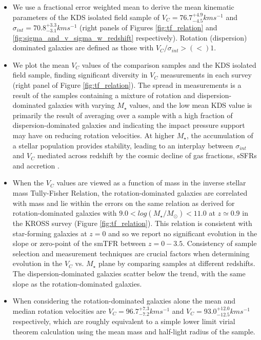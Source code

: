 \documentclass[fleqn,usenatbib]{mnras}
\begin{document}
\begin{itemize}
    \item We use a fractional error weighted mean to derive the mean kinematic parameters of the KDS isolated field sample of $V_{C} = 76.7^{+4.9}_{-4.5}kms^{-1}$ and $\sigma_{int} = 70.8^{+3.3}_{-3.1} kms^{-1}$ (right panels of Figures \ref{fig:tf_relation} and \ref{fig:sigma_and_v_sigma_w_redshift} respectively).
    Rotation (dispersion) dominated galaxies are defined as those with $V_{C}/\sigma_{int} > (<) 1$.  
    \item We plot the mean $V_{C}$ values of the comparison samples and the KDS isolated field sample, finding significant diversity in $V_{C}$ measurements in each survey (right panel of Figure \ref{fig:tf_relation}).
    The spread in measurements is a result of the samples containing a mixture of rotation and dispersion-dominated galaxies with varying $M_{\star}$ values, and the low mean KDS value is primarily the result of averaging over a sample with a high fraction of dispersion-dominated galaxies and indicating the impact pressure support may have on reducing rotation velocities.
    At higher $M_{\star}$, the accumulation of a stellar population provides stability, leading to an interplay between $\sigma_{int}$ and $V_{C}$ mediated across redshift by the cosmic decline of gas fractions, sSFRs and accretion \citep[e.g.][]{Law2012b,Wisnioski2015}.
    \item When the $V_{C}$ values are viewed as a function of mass in the inverse stellar mass Tully-Fisher Relation, the rotation-dominated galaxies are correlated with mass and lie within the errors on the same relation as derived for rotation-dominated galaxies with $9.0 < log(M_{\star}/M_{\odot}) < 11.0$ at $z\simeq0.9$ in the KROSS survey (Figure \ref{fig:tf_relation}). %
    This relation is consistent with star-forming galaxies at $z=0$ and so we report no significant evolution in the slope or zero-point of the smTFR between $z=0-3.5$.
    Consistency of sample selection and measurement techniques are crucial factors when determining evolution in the $V_{C}$ vs. $M_{\star}$ plane by comparing samples at different redshifts.
    The dispersion-dominated galaxies scatter below the trend, with the same slope as the rotation-dominated galaxies.
    \item When considering the rotation-dominated galaxies alone the mean and median rotation velocities are $V_{C} = 96.7^{+7.3}_{-7.2}kms^{-1}$ and $V_{C} = 93.0^{+12.0}_{-12.5}kms^{-1}$ respectively, which are roughly equivalent to a simple lower limit virial theorem calculation using the mean mass and half-light radius of the sample.

\end{itemize}
\end{document}
